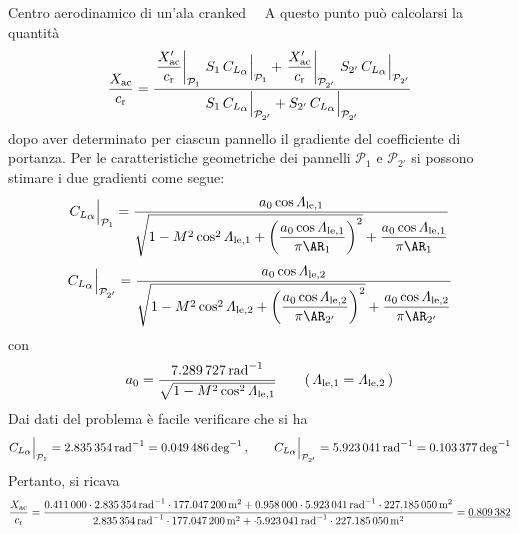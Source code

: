 \documentclass[[12pt,twoside]{book}
\begin{document}
\begin{myExampleX}{Centro aerodinamico di un'ala cranked}{\ \myIconGraph\ }
A questo punto può calcolarsi la quantità
\[
\frac{X_{\mathrm{ac}}}{c_\mathrm{r}}
  = \frac{
    \left.\dfrac{X'_{\mathrm{ac}}}{c_\mathrm{r}}\right|_{\mathcal{P}_{1}}
      \, S_{1} \, C_{L_\mathlarger{\alpha}}\Big|_{\mathcal{P}_{1}}
    +
    \left.\dfrac{X'_{\mathrm{ac}}}{c_\mathrm{r}}\right|_{\mathcal{P}_{2'}}
      \, S_{2'} \, C_{L_\mathlarger{\alpha}}\Big|_{\mathcal{P}_{2'}}
  }{
    S_{1} \, C_{L_\mathlarger{\alpha}}\Big|_{\mathcal{P}_{2'}} 
    + S_{2'} \, C_{L_\mathlarger{\alpha}}\Big|_{\mathcal{P}_{2'}} 
  }
\]
dopo aver determinato per ciascun pannello il gradiente del coefficiente 
di portanza.
Per le caratteristiche geometriche dei pannelli $\mathcal{P}_{1}$ e 
$\mathcal{P}_{2'}$ si possono stimare i due gradienti come segue:
\[
C_{L_\mathlarger{\alpha}}\Big|_{\mathcal{P}_{1}}
  =
  \frac{
    a_0 \cos \Lambda_{\mathrm{le,1}}
  }{
    \sqrt{
      1 - \Mach^2 \cos^2 \Lambda_{\mathrm{le,1}}
        + \left( \dfrac{ a_0 \cos \Lambda_{\mathrm{le,1}} }{ \pi \AR_1} \right)^2
    }
    +
    \dfrac{ a_0 \cos \Lambda_{\mathrm{le,1}} }{ \pi \AR_1}
  }
\]
\[
C_{L_\mathlarger{\alpha}}\Big|_{\mathcal{P}_{2'}}
  =
  \frac{
    a_0 \cos \Lambda_{\mathrm{le,2}}
  }{
    \sqrt{
      1 - \Mach^2 \cos^2 \Lambda_{\mathrm{le,2}}
        + \left( \dfrac{ a_0 \cos \Lambda_{\mathrm{le,2}} }{ \pi \AR_{2'}} \right)^2
    }
    +
    \dfrac{ a_0 \cos \Lambda_{\mathrm{le,2}} }{ \pi \AR_{2'}}
  }
\]
con
\[
a_0 = 
  \frac{
    \SI[round-precision=3]{\myCLAlphaAtMACWingRAD}{\radian^{-1}}
  }{
    \sqrt{ 1 - \Mach^2 \cos^2 \Lambda_{\mathrm{le,1}} }
  }
  \qquad (\, \Lambda_{\mathrm{le,1}} = \Lambda_{\mathrm{le,2}} \,)
\]
Dai dati del problema è facile verificare che si ha
\[
C_{L_\mathlarger{\alpha}}\Big|_{\mathcal{P}_{1}}
  = \SI[round-precision=3]{\myCLAlphaPolhamusWingIRAD}{\radian^{-1}}
  = \SI[round-precision=4]{\myCLAlphaPolhamusWingIDEG}{\deg^{-1}}
\,,
\qquad
C_{L_\mathlarger{\alpha}}\Big|_{\mathcal{P}_{2'}}
  = \SI[round-precision=3]{\myCLAlphaPolhamusWingIIRAD}{\radian^{-1}}
  = \SI[round-precision=4]{\myCLAlphaPolhamusWingIIDEG}{\deg^{-1}}
\]
Pertanto, si ricava
\[
\frac{X_{\mathrm{ac}}}{c_\mathrm{r}}
  = \frac{
    \SI[round-precision=3]{\myXACOverChordRootDatcomWingI}{}
    \cdot \SI[round-precision=3]{\myCLAlphaPolhamusWingIRAD}{\radian^{-1}}
    \cdot \SI[round-precision=1]{\myAreaWingIMTsquared}{\metre^{2}}
    +
    \SI[round-precision=3]{\myXACOverChordRootDatcomWingII}{}
    \cdot \SI[round-precision=3]{\myCLAlphaPolhamusWingIIRAD}{\radian^{-1}}
    \cdot \SI[round-precision=1]{\myAreaWingIIPrimeMTsquared}{\metre^{2}}
  }{
    \SI[round-precision=3]{\myCLAlphaPolhamusWingIRAD}{\radian^{-1}}
    \cdot \SI[round-precision=1]{\myAreaWingIMTsquared}{\metre^{2}}
    +
    \cdot \SI[round-precision=3]{\myCLAlphaPolhamusWingIIRAD}{\radian^{-1}}
    \cdot \SI[round-precision=1]{\myAreaWingIIPrimeMTsquared}{\metre^{2}}  
  }
  = 
  \mathunderline{mydarkblue}{ \SI[round-precision=3]{\myXACOverChordRootDatcomWing}{} }
\]


\end{myExampleX}
\end{document}
